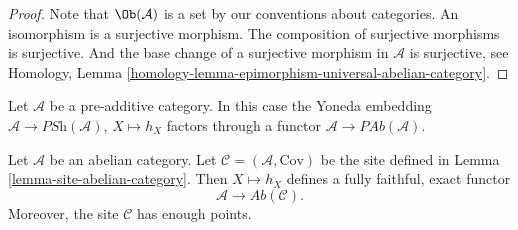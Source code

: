 \begin{proof}
Note that $\Ob(\mathcal{A})$ is a set by our conventions
about categories. An isomorphism is a surjective morphism.
The composition of surjective morphisms is surjective.
And the base change of a surjective morphism in $\mathcal{A}$
is surjective, see
Homology, Lemma \ref{homology-lemma-epimorphism-universal-abelian-category}.
\end{proof}

\noindent
Let $\mathcal{A}$ be a pre-additive category. In this case the
Yoneda embedding $\mathcal{A} \to \textit{PSh}(\mathcal{A})$, $X \mapsto h_X$
factors through a functor $\mathcal{A} \to \textit{PAb}(\mathcal{A})$.

\begin{lemma}
\label{lemma-embedding}
Let $\mathcal{A}$ be an abelian category.
Let $\mathcal{C} = (\mathcal{A}, \text{Cov})$ be the
site defined in
Lemma \ref{lemma-site-abelian-category}.
Then $X \mapsto h_X$ defines a fully faithful, exact functor
$$
\mathcal{A} \longrightarrow \textit{Ab}(\mathcal{C}).
$$
Moreover, the site $\mathcal{C}$ has enough points.
\end{lemma}

